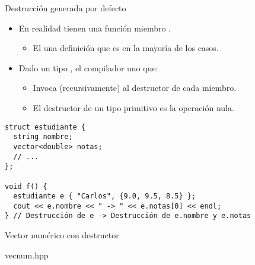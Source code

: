 \begin{frame}[fragile]{Destrucción generada por defecto}
\begin{itemize}
  \item En realidad  tienen una función miembro 
        .
    \begin{itemize}
      \item El  una definición 
            que es  en la mayoría de los casos.
    \end{itemize}

  \item Dado un tipo , 
        el compilador  uno que:
    \begin{itemize}
      \item Invoca (recursivamente) al destructor de cada miembro.
      \item El destructor de un tipo primitivo es la operación nula.
    \end{itemize}
\end{itemize}

\begin{lstlisting}
struct estudiante {
  string nombre;
  vector<double> notas;
  // ...
};

void f() {
  estudiante e { "Carlos", {9.0, 9.5, 8.5} };
  cout << e.nombre << " -> " << e.notas[0] << endl;
} // Destrucción de e -> Destrucción de e.nombre y e.notas
\end{lstlisting}
\end{frame}

\begin{frame}[t]{Vector numérico con destructor}
\begin{block}{vecnum.hpp}
\mode<presentation>{
  
}
\end{block}
\end{frame}
